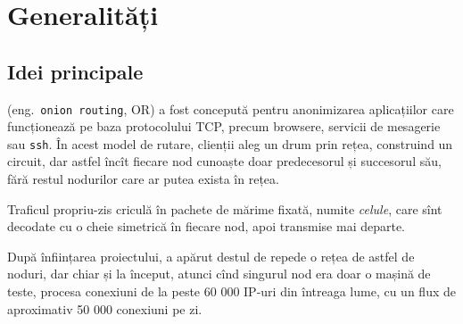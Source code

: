 
\chapter{Generalități}

\section{Idei principale}

\indent\indent {} (eng.\ \texttt{onion routing}, OR) a fost
concepută pentru anonimizarea aplicațiilor care funcționează pe baza protocolului
TCP, precum browsere, servicii de mesagerie sau \texttt{ssh}. În acest model
de rutare, clienții aleg un drum prin rețea, construind un circuit, dar
astfel încît fiecare nod cunoaște doar predecesorul și succesorul său, fără restul
nodurilor care ar putea exista în rețea.

Traficul propriu-zis criculă în pachete de mărime fixată, numite \emph{celule},
 care sînt decodate cu o cheie simetrică în fiecare nod, apoi
transmise mai departe.

După înființarea proiectului, a apărut destul de repede o rețea de astfel de
noduri, dar chiar și la început, atunci cînd singurul nod era doar o mașină de teste,
procesa conexiuni de la peste 60 000 IP-uri din întreaga lume, cu un flux de
aproximativ 50 000 conexiuni pe zi.

